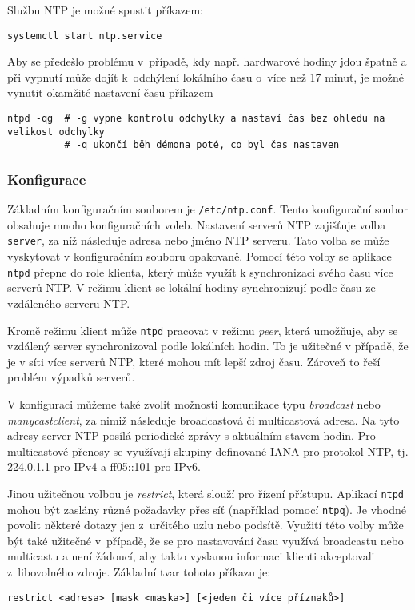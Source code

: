 Službu NTP je možné spustit příkazem:
\begin{verbatim}
systemctl start ntp.service
\end{verbatim}
Aby se předešlo problému v~případě, kdy např. hardwarové hodiny jdou špatně a při vypnutí může dojít k~odchýlení lokálního času o~více než 17 minut, je možné vynutit okamžité nastavení času příkazem
\begin{verbatim}
ntpd -qg  # -g vypne kontrolu odchylky a nastaví čas bez ohledu na velikost odchylky
          # -q ukončí běh démona poté, co byl čas nastaven
\end{verbatim}

\subsubsection{Konfigurace}
Základním konfiguračním souborem je {\tt /etc/ntp.conf}. Tento konfigurační soubor obsahuje mnoho
konfiguračních voleb. Nastavení serverů NTP zajišťuje volba {\tt server}, za níž následuje adresa nebo jméno NTP serveru. Tato volba se může vyskytovat v konfiguračním souboru opakovaně. Pomocí této volby se aplikace {\tt ntpd} přepne do role klienta, který může využít k synchronizaci svého času více serverů NTP. V režimu klient se lokální hodiny synchronizují podle času ze vzdáleného serveru NTP. 

Kromě režimu klient může {\tt ntpd} pracovat v režimu {\em peer}, která umožňuje, aby se vzdálený server synchronizoval podle lokálních hodin. To je užitečné v případě, že je v síti více serverů NTP, které mohou mít lepší zdroj času. Zároveň to řeší problém výpadků serverů. 

V konfiguraci můžeme také zvolit možnosti komunikace typu {\em broadcast} nebo {\em manycastclient}, za nimiž následuje broadcastová či multicastová adresa. Na tyto adresy server NTP posílá periodické zprávy s aktuálním stavem hodin. Pro multicastové přenosy se využívají skupiny definované IANA pro protokol NTP, tj. 224.0.1.1 pro IPv4 a ff05::101 pro IPv6. 

Jinou užitečnou volbou je {\em restrict}, která slouží pro řízení přístupu. Aplikací {\tt ntpd} mohou být zaslány různé požadavky přes síť (například pomocí {\tt ntpq}). Je vhodné povolit některé dotazy jen z~určitého uzlu nebo podsítě. Využití této volby může být také užitečné v~případě, že se pro nastavování času využívá broadcastu nebo multicastu a není žádoucí, aby takto vyslanou informaci klienti akceptovali z~libovolného zdroje. Základní tvar tohoto příkazu je:
\begin{verbatim}
restrict <adresa> [mask <maska>] [<jeden či více příznaků>]
\end{verbatim}

